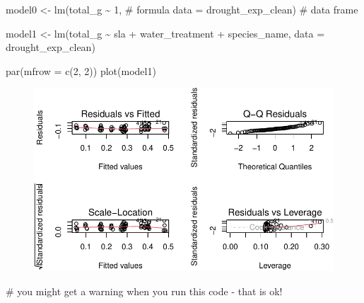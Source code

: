 \documentclass[
  letterpaper,
  DIV=11,
  numbers=noendperiod]{scrartcl}
\newenvironment{Shaded}{\begin{snugshade}}{\end{snugshade}}
\newcommand{\AttributeTok}[1]{\textcolor[rgb]{0.40,0.45,0.13}{#1}}
\newcommand{\CommentTok}[1]{\textcolor[rgb]{0.37,0.37,0.37}{#1}}
\newcommand{\DecValTok}[1]{\textcolor[rgb]{0.68,0.00,0.00}{#1}}
\newcommand{\FunctionTok}[1]{\textcolor[rgb]{0.28,0.35,0.67}{#1}}
\newcommand{\NormalTok}[1]{\textcolor[rgb]{0.00,0.23,0.31}{#1}}
\newcommand{\OtherTok}[1]{\textcolor[rgb]{0.00,0.23,0.31}{#1}}
\newcommand{\SpecialCharTok}[1]{\textcolor[rgb]{0.37,0.37,0.37}{#1}}
\begin{document}
\begin{Shaded}
\begin{Highlighting}[]
\NormalTok{model0 }\OtherTok{\textless{}{-}} \FunctionTok{lm}\NormalTok{(total\_g }\SpecialCharTok{\textasciitilde{}} \DecValTok{1}\NormalTok{, }\CommentTok{\# formula}
             \AttributeTok{data =}\NormalTok{ drought\_exp\_clean) }\CommentTok{\# data frame}
\end{Highlighting}
\end{Shaded}

\begin{Shaded}
\begin{Highlighting}[]
\NormalTok{model1 }\OtherTok{\textless{}{-}} \FunctionTok{lm}\NormalTok{(total\_g }\SpecialCharTok{\textasciitilde{}}\NormalTok{ sla }\SpecialCharTok{+}\NormalTok{ water\_treatment }\SpecialCharTok{+}\NormalTok{ species\_name,}
             \AttributeTok{data =}\NormalTok{ drought\_exp\_clean)}

\FunctionTok{par}\NormalTok{(}\AttributeTok{mfrow =} \FunctionTok{c}\NormalTok{(}\DecValTok{2}\NormalTok{, }\DecValTok{2}\NormalTok{))}
\FunctionTok{plot}\NormalTok{(model1)}
\end{Highlighting}
\end{Shaded}

\begin{figure}[H]

{\centering \includegraphics{Odile_Gabbiani_homework-03_files/figure-pdf/unnamed-chunk-8-1.pdf}

}

\end{figure}

\begin{Shaded}
\begin{Highlighting}[]
\CommentTok{\# you might get a warning when you run this code {-} that is ok!}
\end{Highlighting}
\end{Shaded}
\end{document}
